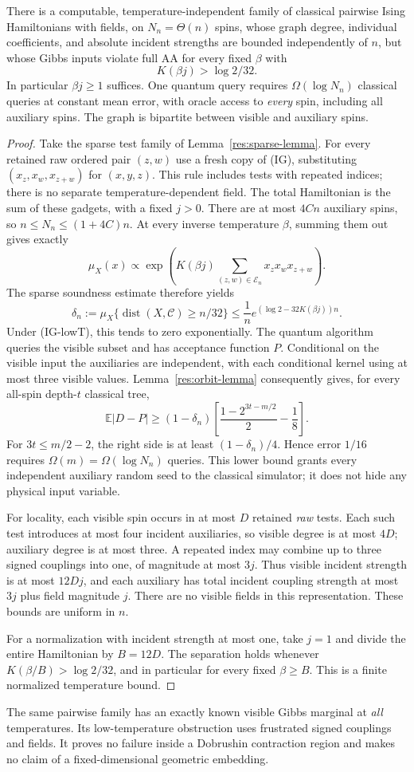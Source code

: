 \begin{theorem}
\label{res:pairwise-theorem}
There is a computable, temperature-independent family of classical
pairwise Ising Hamiltonians with fields, on $N_n=\Theta(n)$ spins,
whose graph degree, individual coefficients, and absolute incident
strengths are bounded independently of $n$, but whose Gibbs inputs
violate full AA for every fixed $\beta$ with
\[
 K(\beta j)>\log2/32.
 \tag{IG-lowT}
\]
In particular $\beta j\ge1$ suffices. One quantum query requires
$\Omega(\log N_n)$ classical queries at constant mean error, with
oracle access to \emph{every} spin, including all auxiliary spins.
The graph is bipartite between visible and auxiliary spins.
\end{theorem}

\begin{proof}
Take the sparse test family of Lemma~\ref{res:sparse-lemma}. For
every retained raw ordered pair $(z,w)$ use a fresh copy of (IG),
substituting $(x_z,x_w,x_{z+w})$ for $(x,y,z)$. This rule includes
tests with repeated indices; there is no separate temperature-dependent
field. The total Hamiltonian is the sum of these gadgets, with a
fixed $j>0$. There are at most $4Cn$ auxiliary spins, so
$n\le N_n\le(1+4C)n$. At every inverse temperature $\beta$, summing
them out gives exactly
\[
 \mu_X(x)\propto\exp\left(K(\beta j)
              \sum_{(z,w)\in\mathcal E_n}x_zx_wx_{z+w}\right).
\]
The sparse soundness estimate therefore yields
\[
 \delta_n:=\mu_X\{\operatorname{dist}(X,\mathcal C)\ge n/32\}
 \le\frac1n e^{(\log2-32K(\beta j))n}.
\]
Under (IG-lowT), this tends to zero exponentially. The quantum
algorithm queries the visible subset and has acceptance function $P$.
Conditional on the visible input the auxiliaries are independent,
with each conditional kernel using at most three visible values.
Lemma~\ref{res:orbit-lemma} consequently gives, for every all-spin
depth-$t$ classical tree,
\[
 \mathbb E|D-P|\ge
 (1-\delta_n)\left[\frac{1-2^{3t-m/2}}2-\frac18\right].
\]
For $3t\le m/2-2$, the right side is at least $(1-\delta_n)/4$.
Hence error $1/16$ requires $\Omega(m)=\Omega(\log N_n)$ queries.
This lower bound grants every independent auxiliary random seed to
the classical simulator; it does not hide any physical input variable.

For locality, each visible spin occurs in at most $D$ retained
\emph{raw} tests. Each such test introduces at most four incident
auxiliaries, so visible degree is at most $4D$; auxiliary degree is
at most three. A repeated index may combine up to three signed
couplings into one, of magnitude at most $3j$. Thus visible incident
strength is at most $12Dj$, and each auxiliary has total incident
coupling strength at most $3j$ plus field magnitude $j$. There are
no visible fields in this representation. These bounds are uniform
in $n$.

For a normalization with incident strength at most one, take $j=1$
and divide the entire Hamiltonian by $B=12D$. The separation holds
whenever $K(\beta/B)>\log2/32$, and in particular for every fixed
$\beta\ge B$. This is a finite normalized temperature bound.
\end{proof}

The same pairwise family has an exactly known visible Gibbs marginal
at \emph{all} temperatures. Its low-temperature obstruction uses
frustrated signed couplings and fields. It proves no failure inside
a Dobrushin contraction region and makes no claim of a
fixed-dimensional geometric embedding.

